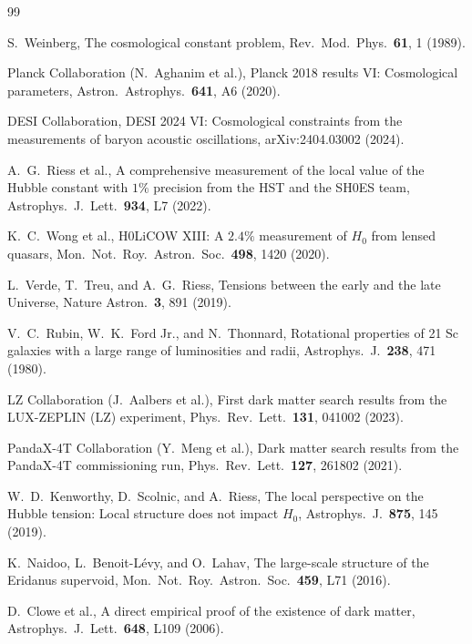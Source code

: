 \documentclass[11pt,twocolumn]{article}
\theoremstyle{plain}
\theoremstyle{remark}
\begin{document}
\begin{thebibliography}{99}

S.~Weinberg,
The cosmological constant problem,
Rev.\ Mod.\ Phys.\ \textbf{61}, 1 (1989).

Planck Collaboration (N.~Aghanim et al.),
Planck 2018 results VI: Cosmological parameters,
Astron.\ Astrophys.\ \textbf{641}, A6 (2020).

DESI Collaboration,
DESI 2024 VI: Cosmological constraints from the measurements of
baryon acoustic oscillations,
arXiv:2404.03002 (2024).

A.~G.~Riess et al.,
A comprehensive measurement of the local value of the Hubble constant
with $1\%$ precision from the HST and the SH0ES team,
Astrophys.\ J.\ Lett.\ \textbf{934}, L7 (2022).

K.~C.~Wong et al.,
H0LiCOW XIII: A $2.4\%$ measurement of $H_0$ from lensed quasars,
Mon.\ Not.\ Roy.\ Astron.\ Soc.\ \textbf{498}, 1420 (2020).

L.~Verde, T.~Treu, and A.~G.~Riess,
Tensions between the early and the late Universe,
Nature Astron.\ \textbf{3}, 891 (2019).

V.~C.~Rubin, W.~K.~Ford Jr., and N.~Thonnard,
Rotational properties of 21 Sc galaxies with a large range of
luminosities and radii,
Astrophys.\ J.\ \textbf{238}, 471 (1980).

LZ Collaboration (J.~Aalbers et al.),
First dark matter search results from the LUX-ZEPLIN (LZ) experiment,
Phys.\ Rev.\ Lett.\ \textbf{131}, 041002 (2023).

PandaX-4T Collaboration (Y.~Meng et al.),
Dark matter search results from the PandaX-4T commissioning run,
Phys.\ Rev.\ Lett.\ \textbf{127}, 261802 (2021).

W.~D.~Kenworthy, D.~Scolnic, and A.~Riess,
The local perspective on the Hubble tension: Local structure does
not impact $H_0$,
Astrophys.\ J.\ \textbf{875}, 145 (2019).

K.~Naidoo, L.~Benoit-L\'{e}vy, and O.~Lahav,
The large-scale structure of the Eridanus supervoid,
Mon.\ Not.\ Roy.\ Astron.\ Soc.\ \textbf{459}, L71 (2016).

D.~Clowe et al.,
A direct empirical proof of the existence of dark matter,
Astrophys.\ J.\ Lett.\ \textbf{648}, L109 (2006).


\end{thebibliography}
\end{document}
